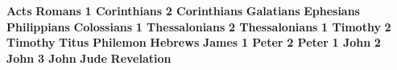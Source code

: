 \documentclass[a4paper,landscape]{letter}
\begin{document}
\textbf{Acts}                            
\textbf{Romans}                
\textbf{1 Corinthians}                
\textbf{2 Corinthians}             
\textbf{Galatians}      
\textbf{Ephesians}      
\textbf{Philippians}     \linebreak
\textbf{Colossians}    
\textbf{1 Thessalonians}     
\textbf{2 Thessalonians}   
\textbf{1 Timothy}      
\textbf{2 Timothy}    
\textbf{Titus}   
\textbf{Philemon} 
\textbf{Hebrews}             
\textbf{James}     
\textbf{1 Peter}     
\textbf{2 Peter}   
\textbf{1 John}     
\textbf{2 John} 
\textbf{3 John} 
\textbf{Jude} 
\textbf{Revelation}                      
\end{document}
